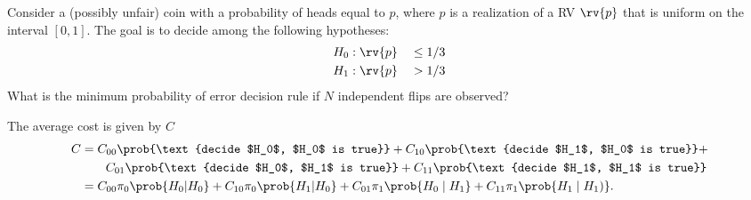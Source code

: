 \begin{example}
    Consider a (possibly unfair) coin with a probability of heads equal to $p$, where $p$ is a realization of a RV $\rv{p}$ that is uniform on the interval $[0,1]$. The goal is to decide among the following hypotheses:
    \begin{alignat}{2}
        H_{0}  &: \rv{p} &&\leq 1 / 3 \\
        H_{1}  &: \rv{p} &&>1 / 3
    \end{alignat}
    What is the minimum probability of error decision rule if $N$ independent flips are observed?

    The average cost is given by $C$ 
    \begin{align}
    \nonumber
        C &= C_{00} \prob{\text{decide $H_0$, $H_0$ is true}} + 
        C_{10} \prob{\text{decide $H_1$, $H_0$ is true}} + \\ 
        &\qquad C_{01} \prob{\text{decide $H_0$, $H_1$ is true}} + 
        C_{11} \prob{\text{decide $H_1$, $H_1$ is true}} \\ 
        &= C_{00} \pi_0 \prob{H_0|H_0} +  C_{10} \pi_0 \prob{H_1|H_0} +   C_{01} \pi_1 \prob{H_0\mid H_1} +  C_{11}\pi_{1}\prob{H_1\mid H_1)}.    
    \end{align}


\end{example}
